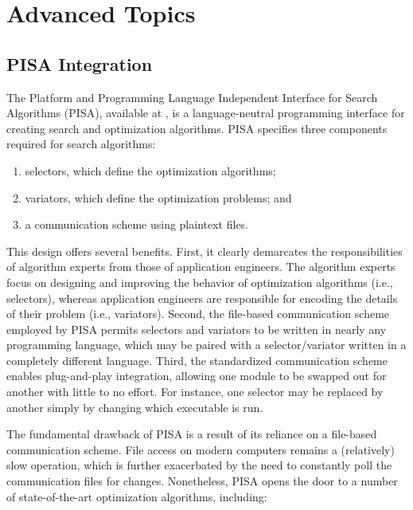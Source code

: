 \chapter{Advanced Topics}

\section{PISA Integration}
The Platform and Programming Language Independent Interface for Search Algorithms (PISA), available at , is a language-neutral programming interface for creating search and optimization algorithms.  PISA specifies three components required for search algorithms:

\begin{enumerate}
  \item selectors, which define the optimization algorithms;
  \item variators, which define the optimization problems; and
  \item a communication scheme using plaintext files.
\end{enumerate}

This design offers several benefits.  First, it clearly demarcates the responsibilities of algorithm experts from those of application engineers.  The algorithm experts focus on designing and improving the behavior of optimization algorithms (i.e., selectors), whereas application engineers are responsible for encoding the details of their problem (i.e., variators).  Second, the file-based communication scheme employed by PISA permits selectors and variators to be written in nearly any programming language, which may be paired with a selector/variator written in a completely different language.  Third, the standardized communication scheme enables plug-and-play integration, allowing one module to be swapped out for another with little to no effort.  For instance, one selector may be replaced by another simply by changing which executable is run.

The fundamental drawback of PISA is a result of its reliance on a file-based communication scheme.  File access on modern computers remains a (relatively) slow operation, which is further exacerbated by the need to constantly poll the communication files for changes.  Nonetheless, PISA opens the door to a number of state-of-the-art optimization algorithms, including:

